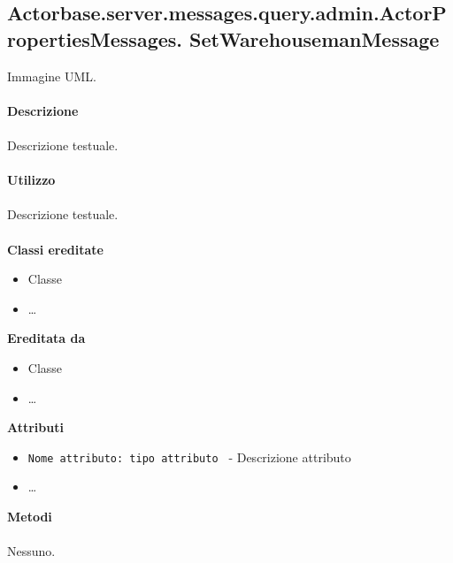 \documentclass[a4paper]{article}
\begin{document}
\subsection{Actorbase.server.messages.query.admin.ActorPropertiesMessages.
\newline SetWarehousemanMessage}
		Immagine UML.
		\\ \\
		\textbf{Descrizione}
			\\ \\
			Descrizione testuale.
			\\ \\
		\textbf{Utilizzo}
			\\ \\
			Descrizione testuale.
			\\ \\
		\textbf{Classi ereditate}
			\begin{itemize}
				\item Classe
				\item \dots
			\end{itemize}
		\textbf{Ereditata da}
			\begin{itemize}
				\item Classe
				\item \dots
			\end{itemize}
		\textbf{Attributi}
			\begin{itemize}
				\item \texttt{Nome attributo: tipo attributo } - Descrizione attributo
				\item \dots
			\end{itemize}
		\textbf{Metodi}
			\\ \\
			Nessuno.			
			
\end{document}
